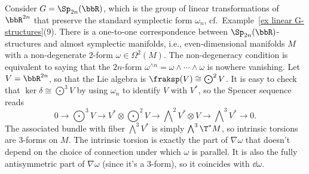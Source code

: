 \begin{example}\label{ex almost symplectic structures}
    Consider $G=\Sp_{2n}(\bbR)$, which is the group of linear transformations of $\bbR^{2n}$ that preserve the standard symplectic form $\omega_n$, cf.\ Example~\ref{ex linear G-structures}(9). There is a one-to-one correspondence between $\Sp_{2n}(\bbR)$-structures and almost symplectic manifolds, i.e., even-dimensional manifolds $M$ with a non-degenerate $2$-form $\omega\in \Omega^2(M)$. The non-degeneracy condition is equivalent to saying that the $2n$-form $\omega^{\wedge n}=\omega\wedge\cdots\wedge\omega$ is nowhere vanishing.
    Let $V=\bbR^{2n}$, so that the Lie algebra is $\fraksp(V)\cong \bigodot\nolimits^2 V$. It is easy to check that $\ker\delta\cong \bigodot\nolimits^3 V$ by using $\omega_n$ to identify $V$ with $V^\ast$, so the Spencer sequence reads 
    \[0\to \bigodot\nolimits^3 V\to V^\ast \otimes \bigodot\nolimits^2V\to \bigwedge\nolimits^2 V^\ast\otimes V\to \bigwedge\nolimits^3 V^\ast\to 0.\]
    The associated bundle with fiber $\bigwedge\nolimits^3 V^\ast$ is simply $\bigwedge\nolimits^3 \T^\ast M$, so intrinsic torsions are $3$-forms on $M$. The intrinsic torsion is exactly the part of $\nabla\omega$ that doesn't depend on the choice of connection under which $\omega$ is parallel. It is also the fully antisymmetric part of $\nabla\omega$ (since it's a $3$-form), so it coincides with $\dd\omega$.


\end{example}
